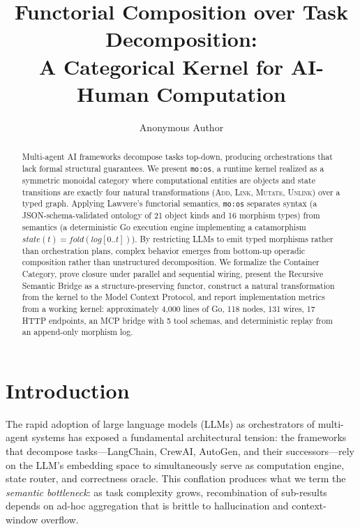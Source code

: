 \documentclass[submission,copyright,creativecommons]{eptcs}
\title{Functorial Composition over Task Decomposition: \\ A Categorical Kernel for AI-Human Computation}
\author{Anonymous Author
\institute{mo:os Project}
\email{author@example.com}
}
\begin{document}
\maketitle

\begin{abstract}
Multi-agent AI frameworks decompose tasks top-down, producing orchestrations
that lack formal structural guarantees. We present \texttt{mo:os}, a runtime
kernel realized as a symmetric monoidal category where computational entities
are objects and state transitions are exactly four natural transformations
(\textsc{Add}, \textsc{Link}, \textsc{Mutate}, \textsc{Unlink}) over a typed
graph. Applying Lawvere's functorial semantics, \texttt{mo:os} separates
syntax (a JSON-schema-validated ontology of 21 object kinds and 16 morphism
types) from semantics (a deterministic Go execution engine implementing a
catamorphism $\mathit{state}(t) = \mathit{fold}(\mathit{log}[0..t])$). By
restricting LLMs to emit typed morphisms rather than orchestration plans,
complex behavior emerges from bottom-up operadic composition rather than
unstructured decomposition. We formalize the Container Category, prove closure
under parallel and sequential wiring, present the Recursive Semantic Bridge as
a structure-preserving functor, construct a natural transformation from the
kernel to the Model Context Protocol, and report implementation metrics from a
working kernel: approximately 4{,}000 lines of Go, 118 nodes, 131 wires, 17 HTTP
endpoints, an MCP bridge with 5 tool schemas, and deterministic replay from an
append-only morphism log.
\end{abstract}

\section{Introduction}
\label{sec:intro}

The rapid adoption of large language models (LLMs) as orchestrators of
multi-agent systems has exposed a fundamental architectural tension: the
frameworks that decompose tasks---LangChain, CrewAI, AutoGen, and their
successors---rely on the LLM's embedding space to simultaneously serve as
computation engine, state router, and correctness oracle. This conflation
produces what we term the \emph{semantic bottleneck}: as task complexity grows,
recombination of sub-results depends on ad-hoc aggregation that is brittle to
hallucination and context-window overflow.
\end{document}
